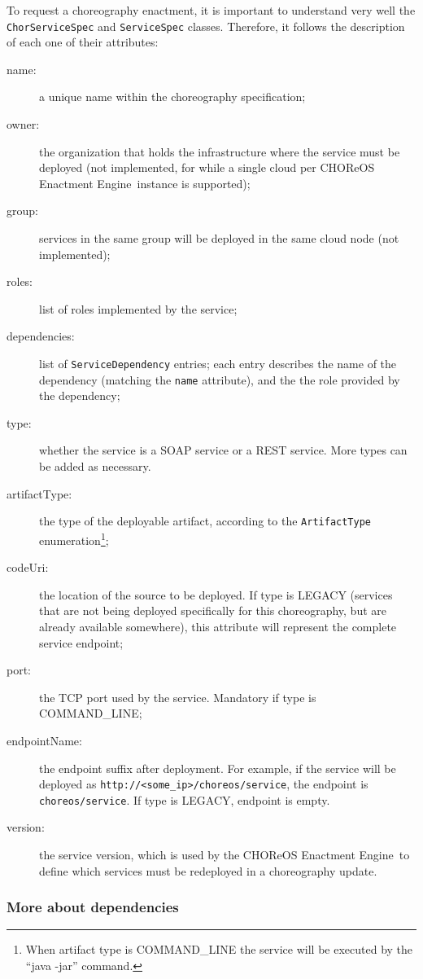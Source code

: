 \documentclass[a4paper, 10pt]{article}
\newcommand{\ee}{CHOReOS Enactment Engine}
\begin{document}
To request a choreography enactment, it is important to understand very well the \verb!ChorServiceSpec! and \verb!ServiceSpec! classes. Therefore, it follows the description of each one of their attributes:

\begin{description}
\item [name:] a unique name within the choreography specification;
\item [owner:] the organization that holds the infrastructure where the service must be deployed (not implemented, for while a single cloud per \ee\ instance is supported);
\item [group:] services in the same group will be deployed in the same cloud node (not implemented);
\item [roles:] list of roles implemented by the service;
\item [dependencies:] list of \verb!ServiceDependency! entries; each entry describes the name of the dependency (matching the \verb!name! attribute), and the the role provided by the dependency;
\item [type:] whether the service is a SOAP service or a REST service. More types can be added as necessary.
\item [artifactType:] the type of the deployable artifact, according to the \verb!ArtifactType! enumeration\footnote{When artifact type is COMMAND\_LINE the service will be executed by the ``java -jar'' command.};
\item [codeUri:] the location of the source to be deployed. If type is LEGACY (services that are not being deployed specifically for this choreography, but are already available somewhere), this attribute will represent the complete service endpoint;
\item [port:] the TCP port used by the service. Mandatory if type is COMMAND\_LINE;
\item [endpointName:] the endpoint suffix after deployment. For example, if the service will be deployed as \verb!http://<some_ip>/choreos/service!, the endpoint is \verb!choreos/service!. If type is LEGACY, endpoint is empty.
\item [version:] the service version, which is used by the \ee\ to define which services must be redeployed in a choreography update.
\end{description}


\subsubsection*{More about dependencies}
\end{document}
